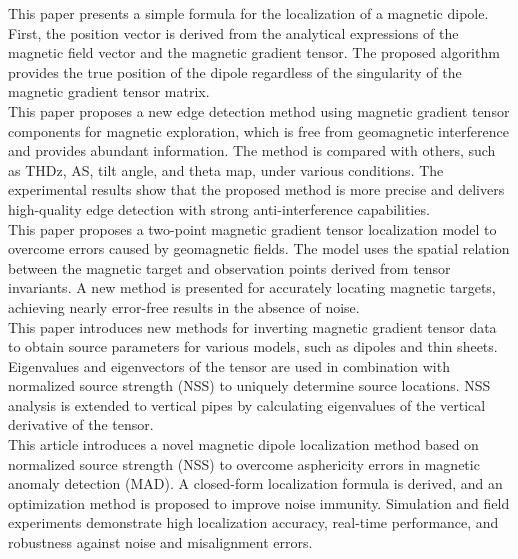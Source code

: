 \cite{single_closed_formula_position}
This paper presents a simple formula for the localization of a magnetic dipole. First, the position vector is derived from the analytical expressions of the magnetic field vector and the magnetic gradient tensor. The proposed algorithm provides the true position of the dipole regardless of the singularity of the magnetic gradient tensor matrix.
\\

\cite{multiple_real_plots_invariants}
This paper proposes a new edge detection method using magnetic gradient tensor components for magnetic exploration, which is free from geomagnetic interference and provides abundant information. The method is compared with others, such as THDz, AS, tilt angle, and theta map, under various conditions. The experimental results show that the proposed method is more precise and delivers high-quality edge detection with strong anti-interference capabilities.
\\

\cite{NSS_formula_important}
This paper proposes a two-point magnetic gradient tensor localization model to overcome errors caused by geomagnetic fields. The model uses the spatial relation between the magnetic target and observation points derived from tensor invariants. A new method is presented for accurately locating magnetic targets, achieving nearly error-free results in the absence of noise.
\\

\cite{NSS_single_different_dimensions}
This paper introduces new methods for inverting magnetic gradient tensor data to obtain source parameters for various models, such as dipoles and thin sheets. Eigenvalues and eigenvectors of the tensor are used in combination with normalized source strength (NSS) to uniquely determine source locations. NSS analysis is extended to vertical pipes by calculating eigenvalues of the vertical derivative of the tensor.
\\

\cite{NSS_single_localization}
This article introduces a novel magnetic dipole localization method based on normalized source strength (NSS) to overcome asphericity errors in magnetic anomaly detection (MAD). A closed-form localization formula is derived, and an optimization method is proposed to improve noise immunity. Simulation and field experiments demonstrate high localization accuracy, real-time performance, and robustness against noise and misalignment errors.
\\

